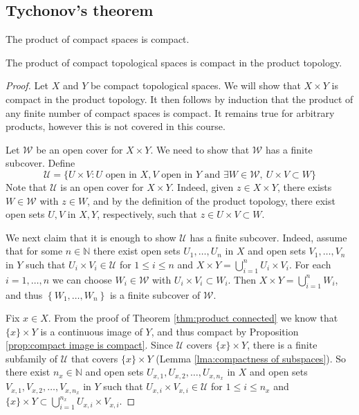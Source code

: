 \documentclass[a4paper,11pt]{article}
\begin{document}
\subsection{Tychonov's theorem}
The product of compact spaces is compact. 
\begin{theorem}\label{thm:Tychonov}
    The product of compact topological spaces is compact in the product topology.
\end{theorem}
\begin{proof}
    Let $X$ and $Y$ be compact topological spaces. We will show that $X \times Y$ is compact in the product topology. It then follows by induction that the product of any finite number of compact spaces is compact. It remains true for arbitrary products, however this is not covered in this course.

Let $\mathcal{W}$ be an open cover for $X \times Y$. We need to show that $\mathcal{W}$ has a finite subcover. Define
$$
\mathcal{U}=\{U \times V: U \text { open in } X, V \text { open in } Y \text { and } \exists W \in \mathcal{W},\ U \times V \subset W\}
$$
Note that $\mathcal{U}$ is an open cover for $X \times Y$. Indeed, given $z \in X \times Y$, there exists $W \in \mathcal{W}$ with $z \in W$, and by the definition of the product topology, there exist open sets $U, V$ in $X, Y$, respectively, such that $z \in U \times V \subset W$.

We next claim that it is enough to show $\mathcal{U}$ has a finite subcover. Indeed, assume that for some $n \in \mathbb{N}$ there exist open sets $U_{1}, \ldots, U_{n}$ in $X$ and open sets $V_{1}, \ldots, V_{n}$ in $Y$ such that $U_{i} \times V_{i} \in \mathcal{U}$ for $1 \leqslant i \leqslant n$ and $X \times Y=\bigcup_{i=1}^{n} U_{i} \times V_{i}$. For each $i=1, \ldots, n$ we can choose $W_{i} \in \mathcal{W}$ with $U_{i} \times V_{i} \subset W_{i}$. Then $X \times Y=\bigcup_{i=1}^{n} W_{i}$, and thus $\left\{W_{1}, \ldots, W_{n}\right\}$ is a finite subcover of $\mathcal{W}$.

Fix $x \in X$. From the proof of Theorem \ref{thm:product connected} we know that $\{x\} \times Y$ is a continuous image of $Y$, and thus compact by Proposition \ref{prop:compact image is compact}. Since $\mathcal{U}$ covers $\{x\} \times Y$, there is a finite subfamily of $\mathcal{U}$ that covers $\{x\} \times Y$ (Lemma \ref{lma:compactness of subspaces}). So there exist $n_{x} \in \mathbb{N}$ and open sets $U_{x, 1}, U_{x, 2}, \ldots, U_{x, n_{x}}$ in $X$ and open sets $V_{x, 1}, V_{x, 2}, \ldots, V_{x, n_{x}}$ in $Y$ such that $U_{x, i} \times V_{x, i} \in \mathcal{U}$ for $1 \leqslant i \leqslant n_{x}$ and $\{x\} \times Y \subset \bigcup_{i=1}^{n_{x}} U_{x, i} \times V_{x, i}$. 


\end{proof}
\end{document}
